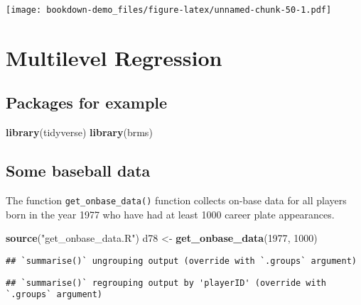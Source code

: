 \documentclass[
]{book}
\newenvironment{Shaded}{\begin{snugshade}}{\end{snugshade}}
\newcommand{\DecValTok}[1]{\textcolor[rgb]{0.00,0.00,0.81}{#1}}
\newcommand{\KeywordTok}[1]{\textcolor[rgb]{0.13,0.29,0.53}{\textbf{#1}}}
\newcommand{\NormalTok}[1]{#1}
\newcommand{\OperatorTok}[1]{\textcolor[rgb]{0.81,0.36,0.00}{\textbf{#1}}}
\newcommand{\StringTok}[1]{\textcolor[rgb]{0.31,0.60,0.02}{#1}}
\begin{document}
\texttt{[image: bookdown-demo\_files/figure-latex/unnamed-chunk-50-1.pdf]}

\hypertarget{multilevel-regression}{%
\chapter{Multilevel Regression}\label{multilevel-regression}}

\hypertarget{packages-for-example}{%
\section{Packages for example}\label{packages-for-example}}

\begin{Shaded}
\begin{Highlighting}[]
\KeywordTok{library}\NormalTok{(tidyverse)}
\KeywordTok{library}\NormalTok{(brms)}
\end{Highlighting}
\end{Shaded}

\hypertarget{some-baseball-data}{%
\section{Some baseball data}\label{some-baseball-data}}

The function \texttt{get\_onbase\_data()} function collects on-base data for all players born in the year 1977 who have had at least 1000 career plate appearances.

\begin{Shaded}
\begin{Highlighting}[]
\KeywordTok{source}\NormalTok{(}\StringTok{"get_onbase_data.R"}\NormalTok{)}
\NormalTok{d78 <-}\StringTok{ }\KeywordTok{get_onbase_data}\NormalTok{(}\DecValTok{1977}\NormalTok{, }\DecValTok{1000}\NormalTok{)}
\end{Highlighting}
\end{Shaded}

\begin{verbatim}
## `summarise()` ungrouping output (override with `.groups` argument)
\end{verbatim}

\begin{verbatim}
## `summarise()` regrouping output by 'playerID' (override with `.groups` argument)
\end{verbatim}

\begin{Shaded}
\end{Shaded}
\end{document}
